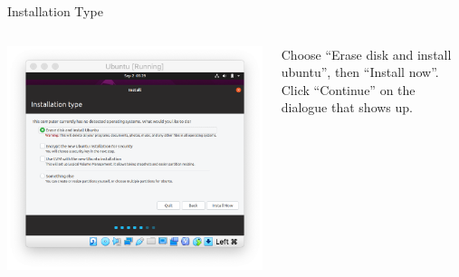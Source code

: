 \documentclass[11pt]{beamer}
\begin{document}
\begin{frame}{Installation Type}
  \begin{columns}
    \begin{column}{0.65\linewidth}
      \includegraphics[width=\linewidth]{ubuntu-disk}
    \end{column}
    \begin{column}{0.35\linewidth}
      Choose ``Erase disk and install ubuntu'', then ``Install now''. Click ``Continue'' on the dialogue that shows up.
    \end{column}
  \end{columns}
\end{frame}
\end{document}
